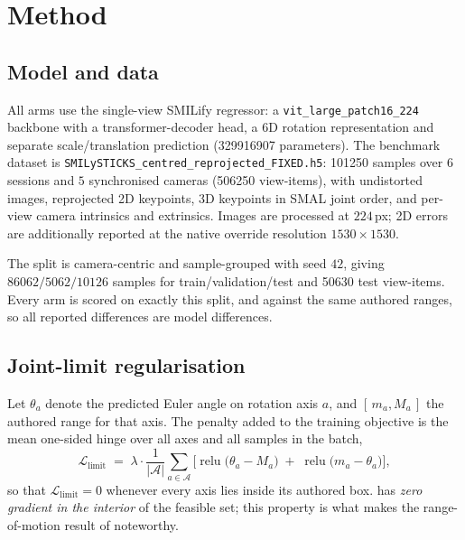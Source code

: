 \documentclass[11pt,a4paper]{article}
\newcommand{\lam}{\lambda}
\begin{document}
\section{Method}
\label{sec:method}

\subsection{Model and data}

All arms use the single-view SMILify regressor: a \texttt{vit\_large\_patch16\_224}
backbone with a transformer-decoder head, a 6D rotation representation and
separate scale/translation prediction (\num{329916907} parameters). The
benchmark dataset is
\texttt{SMILySTICKS\_centred\_reprojected\_FIXED.h5}: \num{101250} samples over
$6$ sessions and $5$ synchronised cameras (\num{506250} view-items), with
undistorted images, reprojected 2D keypoints, 3D keypoints in SMAL joint order,
and per-view camera intrinsics and extrinsics. Images are processed at
$224\,$px; 2D errors are additionally reported at the native override
resolution $1530 \times 1530$.

The split is camera-centric and sample-grouped with seed $42$, giving
$\num{86062}/\num{5062}/\num{10126}$ samples for train/validation/test and
\num{50630} test view-items. Every arm is scored on exactly this split, and
against the same authored ranges, so all reported differences are model
differences.

\subsection{Joint-limit regularisation}

Let $\theta_{a}$ denote the predicted Euler angle on rotation axis $a$, and
$[\,m_a, M_a\,]$ the authored range for that axis. The penalty added to the
training objective is the mean one-sided hinge over all axes and all samples in
the batch,
\begin{equation}
  \mathcal{L}_{\text{limit}}
  \;=\;
  \lam \cdot
  \frac{1}{|\mathcal{A}|}\sum_{a \in \mathcal{A}}
  \Big[
    \operatorname{relu}\!\big(\theta_a - M_a\big)
    \;+\;
    \operatorname{relu}\!\big(m_a - \theta_a\big)
  \Big],
  \label{eq:penalty}
\end{equation}
so that $\mathcal{L}_{\text{limit}} = 0$ whenever every axis lies inside its
authored box.  has \emph{zero gradient in the interior} of the
feasible set; this property is what makes the range-of-motion result of
 noteworthy.
\end{document}

